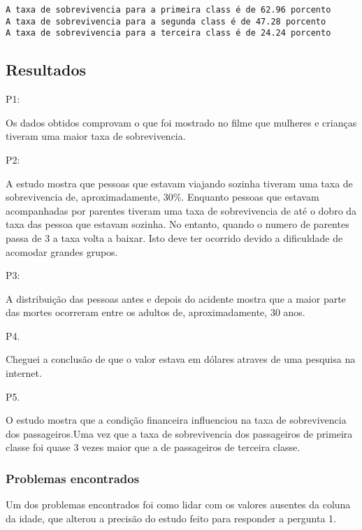 \documentclass[11pt]{article}
\begin{document}
    \begin{Verbatim}[commandchars=\\\{\}]
A taxa de sobrevivencia para a primeira class é de 62.96 porcento
A taxa de sobrevivencia para a segunda class é de 47.28 porcento
A taxa de sobrevivencia para a terceira class é de 24.24 porcento

    \end{Verbatim}

    \hypertarget{resultados}{%
\subsection{Resultados}\label{resultados}}

P1:

Os dados obtidos comprovam o que foi mostrado no filme que mulheres e
crianças tiveram uma maior taxa de sobrevivencia.

P2:

A estudo mostra que pessoas que estavam viajando sozinha tiveram uma
taxa de sobrevivencia de, aproximadamente, 30\%. Enquanto pessoas que
estavam acompanhadas por parentes tiveram uma taxa de sobrevivencia de
até o dobro da taxa das pessoa que estavam sozinha. No entanto, quando o
numero de parentes passa de 3 a taxa volta a baixar. Isto deve ter
ocorrido devido a dificuldade de acomodar grandes grupos.

P3:

A distribuição das pessoas antes e depois do acidente mostra que a maior
parte das mortes ocorreram entre os adultos de, aproximadamente, 30
anos.

P4.

Cheguei a conclusão de que o valor estava em dólares atraves de uma
pesquisa na internet.

P5.

O estudo mostra que a condição financeira influenciou na taxa de
sobrevivencia dos passageiros.Uma vez que a taxa de sobrevivencia dos
passageiros de primeira classe foi quase 3 vezes maior que a de
passageiros de terceira classe.

\hypertarget{problemas-encontrados}{%
\subsubsection{Problemas encontrados}\label{problemas-encontrados}}

Um dos problemas encontrados foi como lidar com os valores ausentes da
coluna da idade, que alterou a precisão do estudo feito para responder a
pergunta 1.
\end{document}
